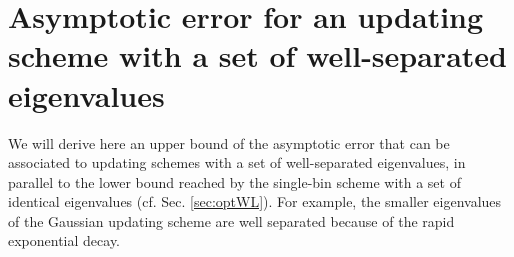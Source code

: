 \documentclass[reprint, superscriptaddress, floatfix]{revtex4-1}
\newcommand{\note}[1]{{\color{DarkGreen}\footnotesize \textsc{Note.} #1}}
\begin{document}







\section{\label{sec:upperbound}
Asymptotic error for an updating scheme
with a set of well-separated eigenvalues}


We will derive here an upper bound of the asymptotic error
that can be associated to updating schemes
with a set of well-separated eigenvalues,
in parallel to the lower bound reached by
the single-bin scheme with a set of identical eigenvalues
(cf. Sec. \ref{sec:optWL}).
%
For example, the smaller eigenvalues of the Gaussian updating scheme
are well separated because of the rapid exponential decay.
\end{document}
